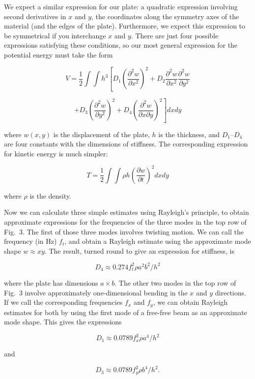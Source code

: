   We expect a similar expression for our plate: a quadratic expression 
  involving second derivatives in $x$ and $y$, the coordinates along the 
  symmetry axes of the material (and the edges of the plate). Furthermore, we 
  expect this expression to be symmetrical if you interchange $x$ and $y$. 
  There are just four possible expressions satisfying these conditions, so our 
  most general expression for the potential energy must take the form 

  $$ V = \dfrac{1}{2} \int{\int{h^3 \left[ D_1 \left(\dfrac{\partial^2 
  w}{\partial x^2} \right)^2 + D_2 \dfrac{\partial^2 w}{\partial x^2} 
  \dfrac{\partial^2 w}{\partial y^2} \right. }} $$ 

  $$ \left. + D_3 \left(\dfrac{\partial^2 w}{\partial y^2} \right)^2 + D_4 
  \left(\dfrac{\partial^2 w}{\partial x \partial y} \right)^2 \right] dx dy 
  \tag{1}$$ 

  where $w(x,y)$ is the displacement of the plate, $h$ is the thickness, and 
  $D_1$--$D_4$ are four constants with the dimensions of stiffness. The 
  corresponding expression for kinetic energy is much simpler: 

  $$T=\dfrac{1}{2} \int{\int{ \rho h \left( \dfrac{\partial w}{\partial t} 
  \right)^2 dx dy }} \tag{2}$$ 

  where $\rho$ is the density. 

  Now we can calculate three simple estimates using Rayleigh's principle, to 
  obtain approximate expressions for the frequencies of the three modes in the 
  top row of Fig.\ 3. The first of those three modes involves twisting motion. 
  We can call the frequency (in Hz) $f_t$, and obtain a Rayleigh estimate using 
  the approximate mode shape $w \approx xy .$ The result, turned round to give 
  an expression for stiffness, is 

  $$D_4 \approx 0.274 f_t^2 \rho a^2 b^2/h^2 \tag{3}$$ 

  where the plate has dimensions $a \times b$. The other two modes in the top 
  row of Fig.\ 3 involve approximately one-dimensional bending in the $x$ and 
  $y$ directions. If we call the corresponding frequencies $f_x$ and $f_y$, we 
  can obtain Rayleigh estimates for both by using the first mode of a free-free 
  beam as an approximate mode shape. This gives the expressions 

  $$D_1 \approx 0.0789 f_x^2 \rho a^4/h^2 \tag{4}$$ 

  and 

  $$D_3 \approx 0.0789 f_y^2 \rho b^4/h^2 . \tag{5}$$ 

